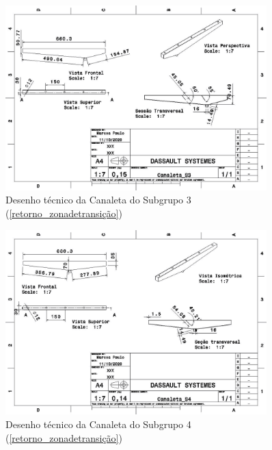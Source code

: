 \begin{apendicesenv}
\begin{figure}[H]
    \centering
    \includegraphics[width=0.9\textwidth]{figuras/estrutura/Desenhos/Canaleta_S3.jpg}
    \caption{Desenho técnico da Canaleta do Subgrupo 3 (\ref{retorno_zonadetransição})}
    \label{fig:canaletaS3}
\end{figure}

\begin{figure}[H]
    \centering
    \includegraphics[width=0.9\textwidth]{figuras/estrutura/Desenhos/Canaleta_S4.jpg}
    \caption{Desenho técnico da Canaleta do Subgrupo 4 (\ref{retorno_zonadetransição})}
    \label{fig:canaletaS4}
\end{figure}


\end{apendicesenv}

